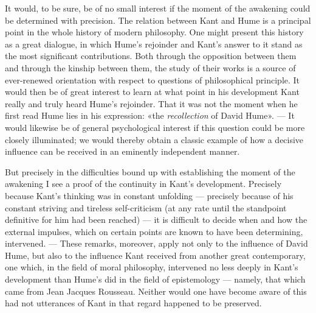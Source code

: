 \documentclass[12pt,a4paper]{article}
\newcommand{\opage}[1]{\marginnote{\footnotesize\textit{[#1]}}}
\begin{document}
It would, to be sure, be of no small interest if the moment of the
awakening could be determined with precision. The relation between Kant
and Hume is a principal point in the whole history of modern philosophy.
One might present this history as a great dialogue, in which Hume's
rejoinder and Kant's answer to it stand as the most significant
contributions. Both through the opposition between them and through the
kinship between them, the study of their works is a source of ever-renewed
orientation with respect to questions of philosophical principle. It would
then be of great interest to learn at what point in his development Kant
really and truly heard Hume's rejoinder. That it was not the moment when
he first read Hume lies in his expression: «the \emph{recollection} of David
Hume». --- It would likewise be of general psychological interest if this
question could be more closely illuminated; we would thereby obtain a
classic example of how a decisive influence can be received in an
eminently independent manner.

But precisely in the difficulties bound up with establishing the \opage{8}moment of
the awakening I see a proof of the continuity in Kant's development.
Precisely because Kant's thinking was in constant unfolding --- precisely
because of his constant striving and tireless self-criticism (at any rate
until the standpoint definitive for him had been reached) --- it is
difficult to decide when and how the external impulses, which on certain
points are known to have been determining, intervened. --- These remarks,
moreover, apply not only to the influence of David Hume, but also to the
influence Kant received from another great contemporary, one which, in
the field of moral philosophy, intervened no less deeply in Kant's
development than Hume's did in the field of epistemology --- namely, that
which came from Jean Jacques Rousseau. Neither would one have become aware
of this had not utterances of Kant in that regard happened to be
preserved.
\end{document}
